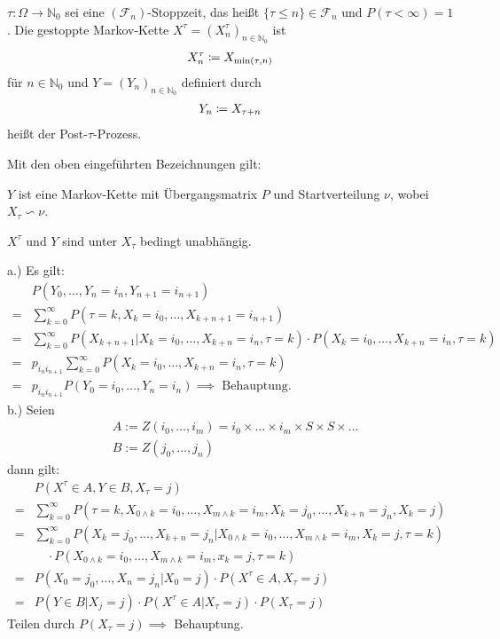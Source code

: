 \documentclass[a4paper,twoside,DIV15,BCOR12mm]{scrbook}
\newcommand{\cF}{\mathcal F}
\begin{document}
$\tau:\Omega \to \mathbb N_0$ sei eine $(\cF_n)$-Stoppzeit, das heißt $\{\tau \le n\} \in \cF_n$ und $P(\tau <\infty) = 1$. Die gestoppte Markov-Kette $X^\tau=(X_n^\tau)_{n\in\mathbb N_0}$ ist
\begin{align*}
X_n^\tau \da X_{\min(\tau,n)}
\end{align*}
für $n\in \mathbb N_0$ und $Y=(Y_n)_{n\in\mathbb N_0}$ definiert durch
\begin{align*}
Y_n \da X_{\tau + n}
\end{align*}
heißt der Post-$\tau$-Prozess.

\begin{satz}
  \label{Satz6.1}
  Mit den oben eingeführten Bezeichnungen gilt:
  \begin{enuma}
  \item $Y$ ist eine Markov-Kette mit Übergangsmatrix $P$ 
    und Startverteilung $\nu$, wobei $X_\tau\backsim\nu$.
  \item $X^\tau$ und $Y$ sind unter $X_\tau$ bedingt unabhängig.
  \end{enuma}
\end{satz}

\begin{beweis}
  a.) Es gilt:
  \begin{align*}
    & P(Y_0,\dots,Y_n=i_n,Y_{n+1}=i_{n+1}) \\
    = & \sum_{k=0}^\infty P(\tau=k,X_k=i_0,\dots,X_{k+n+1}=i_{n+1}) \\
    = & \sum_{k=0}^\infty P(X_{k+n+1} \vert X_k=i_0,\dots,X_{k+n}=i_n,\tau=k) 
    \cdot P(X_k=i_0,\dots,X_{k+n}=i_n,\tau=k) \\
    = & p_{i_n i_{n+1}} \sum_{k=0}^\infty P(X_k=i_0,\dots,X_{k+n}=i_n,\tau=k) \\
    = & p_{i_n i_{n+1}} P(Y_0=i_0,\dots,Y_n=i_n) \implies \text{ Behauptung}.
  \end{align*}
  b.) Seien
  \begin{align*}
    & A:=Z(i_0,\dots,i_m)={i_0}\times\dots\times {i_m}\times S\times S \times\dots \\
    & B:=Z(j_0,\dots,j_n)
  \end{align*}
  dann gilt:
  \begin{align*}
    & P(X^\tau\in A,Y\in B,X_\tau =j) \\
    =& \sum_{k=0}^\infty P(\tau=k,X_{0\wedge k}=i_0,\dots,X_{m\wedge k}=i_m,
    X_k=j_0,\dots,X_{k+n}=j_n,X_k=j) \\
    =& \sum_{k=0}^\infty P(X_k=j_0,\dots,X_{k+n}=j_n\vert 
    X_{0\wedge k}=i_0,\dots,X_{m\wedge k}=i_m,X_k=j,\tau=k) \\
    & \quad \cdot P(X_{0\wedge k}=i_0,\dots,X_{m\wedge k}=i_m,x_k=j,\tau=k) \\
    =& P(X_0=j_0,\dots,X_n=j_n\vert X_0=j) \cdot P(X^\tau \in A, X_\tau=j) \\
    =& P(Y\in B\vert X_j=j) \cdot P(X^\tau\in A\vert X_\tau=j) \cdot P(X_\tau=j) 
  \end{align*}
  Teilen durch $P(X_\tau=j) \implies$ Behauptung.
\end{beweis}
\end{document}

